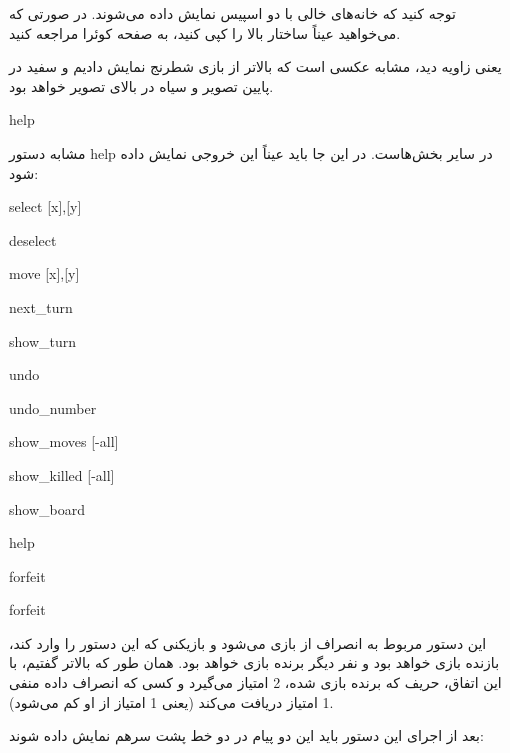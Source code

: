 \documentclass[]{article}
\begin{document}
توجه کنید که خانه‌های خالی با دو اسپیس نمایش داده می‌شوند. در صورتی که می‌خواهید عیناً ساختار بالا را کپی کنید، به صفحه کوئرا مراجعه کنید.


یعنی زاویه دید، مشابه عکسی است که بالاتر از بازی شطرنج نمایش دادیم و سفید در پایین تصویر و سیاه در بالای تصویر خواهد بود.

\hrulefill
\newpage

\begin{tcolorbox}[boxrule=0pt]
	\begin{latin}
  	  \large{
  	  	help
		}
	\end{latin}
\end{tcolorbox}

مشابه دستور help در سایر بخش‌هاست. در این جا باید عیناً این خروجی نمایش داده شود:



\begin{tcolorbox}[boxrule=0pt]
	\begin{latin}
  	  \large{
  	  	select [x],[y]
  	  	
deselect

move [x],[y]

next\_turn

show\_turn

undo

undo\_number

show\_moves [-all]

show\_killed [-all]

show\_board

help

forfeit
		}
	\end{latin}
\end{tcolorbox}

\hrulefill



\begin{tcolorbox}[boxrule=0pt]
	\begin{latin}
  	  \large{
  	  	forfeit
		}
	\end{latin}
\end{tcolorbox}

این دستور مربوط به انصراف از بازی می‌شود و بازیکنی که این دستور را وارد کند، بازنده بازی خواهد بود و نفر دیگر برنده بازی خواهد بود. همان طور که بالاتر گفتیم، با این اتفاق، حریف که برنده بازی شده، 2 امتیاز می‌گیرد و کسی که انصراف داده منفی 1 امتیاز دریافت می‌کند (یعنی 1 امتیاز از او کم می‌شود).

بعد از اجرای این دستور باید این دو پیام در دو خط پشت سرهم نمایش داده شوند:
\end{document}
